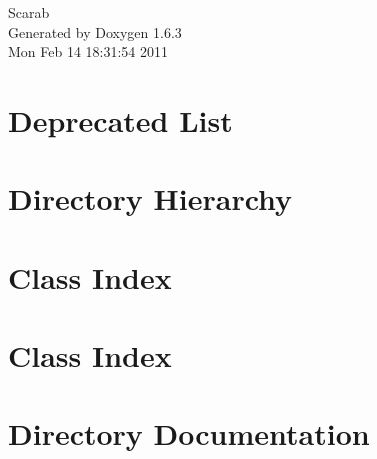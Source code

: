 \documentclass[a4paper]{book}
\begin{document}
\hypersetup{pageanchor=false}
\begin{titlepage}
\vspace*{7cm}
\begin{center}
{\Large Scarab }\\
\vspace*{1cm}
{\large Generated by Doxygen 1.6.3}\\
\vspace*{0.5cm}
{\small Mon Feb 14 18:31:54 2011}\\
\end{center}
\end{titlepage}
\clearemptydoublepage
{}
\tableofcontents
\clearemptydoublepage
{}
\hypersetup{pageanchor=true}
\chapter{Deprecated List}
\label{deprecated}
\hypertarget{deprecated}{}

\chapter{Directory Hierarchy}

\chapter{Class Index}

\chapter{Class Index}

\chapter{Directory Documentation}










\end{document}
